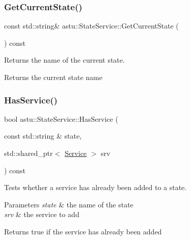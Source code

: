 \subsubsection{\texorpdfstring{Get\+Current\+State()}{GetCurrentState()}}
{\footnotesize\ttfamily const std\+::string\& astu\+::\+State\+Service\+::\+Get\+Current\+State (\begin{DoxyParamCaption}{ }\end{DoxyParamCaption}) const}

Returns the name of the current state.

\begin{DoxyReturn}{Returns}
the current state name 
\end{DoxyReturn}
\mbox{\label{classastu_1_1StateService_ad32ec7a0c3afe7e902aa85de8b4fed15}} 
\subsubsection{\texorpdfstring{Has\+Service()}{HasService()}}
{\footnotesize\ttfamily bool astu\+::\+State\+Service\+::\+Has\+Service (\begin{DoxyParamCaption}\item[{const std\+::string \&}]{state,  }\item[{std\+::shared\+\_\+ptr$<$ \hyperlink{classastu_1_1Service}{Service} $>$}]{srv }\end{DoxyParamCaption}) const}

Tests whether a service has already been added to a state.


\begin{DoxyParams}{Parameters}
{\em state} & the name of the state \\
\hline
{\em srv} & the service to add \\
\hline
\end{DoxyParams}
\begin{DoxyReturn}{Returns}
{\ttfamily true} if the service has already been added 
\end{DoxyReturn}
\mbox{\label{classastu_1_1StateService_adfd94f9b5d622131a1fdcc4dcf5ef51d}} 
